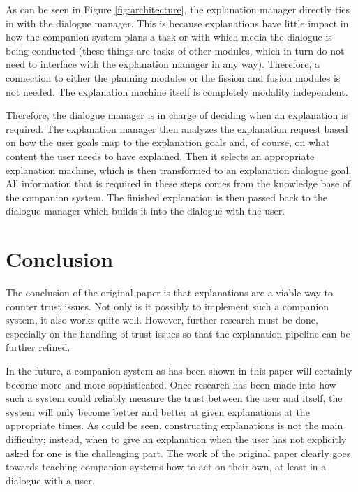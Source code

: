 \documentclass[a4paper]{article}
\begin{document}
As can be seen in Figure \ref{fig:architecture}, the explanation manager directly ties in with the dialogue manager. This is because explanations have little impact in how the companion system plans a task or with which media the dialogue is being conducted (these things are tasks of other modules, which in turn do not need to interface with the explanation manager in any way). Therefore, a connection to either the planning modules or the fission and fusion modules is not needed. The explanation machine itself is completely modality independent.

Therefore, the dialogue manager is in charge of deciding when an explanation is required. The explanation manager then analyzes the explanation request based on how the user goals map to the explanation goals and, of course, on what content the user needs to have explained. Then it selects an appropriate explanation machine, which is then transformed to an explanation dialogue goal. All information that is required in these steps comes from the knowledge base of the companion system. The finished explanation is then passed back to the dialogue manager which builds it into the dialogue with the user.

\section{Conclusion}

The conclusion of the original paper is that explanations are a viable way to counter trust issues. Not only is it possibly to implement such a companion system, it also works quite well. However, further research must be done, especially on the handling of trust issues so that the explanation pipeline can be further refined.

In the future, a companion system as has been shown in this paper will certainly become more and more sophisticated. Once research has been made into how such a system could reliably measure the trust between the user and itself, the system will only become better and better at given explanations at the appropriate times. As could be seen, constructing explanations is not the main difficulty; instead, when to give an explanation when the user has not explicitly asked for one is the challenging part. The work of the original paper clearly goes towards teaching companion systems how to act on their own, at least in a dialogue with a user.


\end{document}
